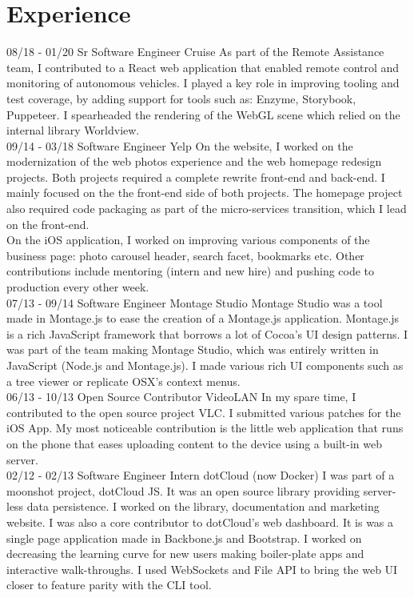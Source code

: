 \documentclass[]{friggeri-cv}
\begin{document}
\section{Experience}
\begin{entrylist}
    \entry
    {08/18 - 01/20}
    {Sr Software Engineer}
    {Cruise}
    {As part of the Remote Assistance team, I contributed to a React web application that enabled remote control and monitoring of autonomous vehicles. I played a key role in improving tooling and test coverage, by adding support for tools such as: Enzyme, Storybook, Puppeteer. I spearheaded the rendering of the WebGL scene which relied on the internal library Worldview.\\}
    \entry
    {09/14 - 03/18}
    {Software Engineer}
    {Yelp}
    {On the website, I worked on the modernization of the web photos experience and the web homepage redesign projects. Both projects required a complete rewrite front-end and back-end. I mainly focused on the the front-end side of both projects. The homepage project also required code packaging as part of the micro-services transition, which I lead on the front-end.\\
    On the iOS application, I worked on improving various components of the business page: photo carousel header, search facet, bookmarks etc.
    Other contributions include mentoring (intern and new hire) and pushing code to production every other week.
    \\}
    \entry
    {07/13 - 09/14}
    {Software Engineer}
    {Montage Studio}
    {Montage Studio was a tool made in Montage.js to ease the creation of a Montage.js application. Montage.js is a rich JavaScript framework that borrows a lot of Cocoa's UI design patterns. I was part of the team making Montage Studio, which was entirely written in JavaScript (Node.js and Montage.js). I made various rich UI components such as a tree viewer or replicate OSX's context menus.\\}
    \entry
    {06/13 - 10/13}
    {Open Source Contributor}
    {VideoLAN}
    {In my spare time, I contributed to the open source project VLC. I submitted various patches for the iOS App. My most noticeable contribution is the little web application that runs on the phone that eases uploading content to the device using a built-in web server.\\}
    \entry
    {02/12 - 02/13}
    {Software Engineer Intern}
    {dotCloud (now Docker)}
    {I was part of a moonshot project, dotCloud JS. It was an open source library providing server-less data persistence. I worked on the library, documentation and marketing website. I was also a core contributor to dotCloud's web dashboard. It is was a single page application made in Backbone.js and Bootstrap. I worked on decreasing the learning curve for new users making boiler-plate apps and interactive walk-throughs. I used WebSockets and File API to bring the web UI closer to feature parity with the CLI tool.\\}
\end{entrylist}
  ~
 \pagebreak
  ~
\end{document}
